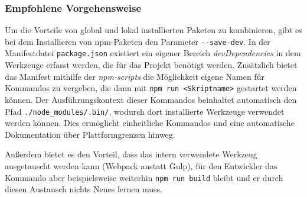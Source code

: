 \subsubsection{Empfohlene Vorgehensweise}
\label{subsub:packages-best-practice}
Um die Vorteile von global und lokal installierten Paketen zu kombinieren, gibt es bei dem Installieren von npm-Paketen den Parameter \verb|--save-dev|.
In der Manifestdatei \verb|package.json| existiert ein eigener Bereich \emph{devDependencies} in dem Werkzeuge erfasst werden, die für das Projekt benötigt werden.
Zusätzlich bietet das Manifest mithilfe der \emph{npm-scripts} die Möglichkeit eigene Namen für Kommandos zu vergeben, die dann mit \verb|npm run <Skriptname>| gestartet werden können.
Der Ausführungskontext dieser Kommandos beinhaltet automatisch den Pfad \verb|./node_modules/.bin/|, wodurch dort installierte Werkzeuge verwendet werden können.
Dies ermöglicht einheitliche Kommandos und eine automatische Dokumentation über Plattformgrenzen hinweg.

Außerdem bietet es den Vorteil, dass das intern verwendete Werkzeug ausgetauscht werden kann (\zB Webpack anstatt Gulp), für den Entwickler das Kommando aber beispielsweise weiterhin \verb|npm run build| bleibt und er durch diesen Austausch nichts Neues lernen muss.
